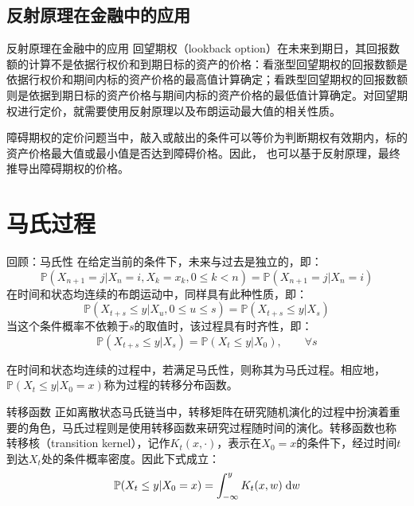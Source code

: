 \documentclass[t]{beamer}
\newcommand{\dif}{{\;\rm d}}
\renewcommand{\Pr}{\mathbb{P}}
\begin{document}
\subsection{反射原理在金融中的应用}
\begin{frame}{反射原理在金融中的应用}
  回望期权（lookback option）在未来到期日，其回报数额的计算不是依据行权价和到期日标的资产的价格：看涨型回望期权的回报数额是依据行权价和期间内标的资产价格的最高值计算确定；看跌型回望期权的回报数额则是依据到期日标的资产价格与期间内标的资产价格的最低值计算确定。对回望期权进行定价，就需要使用反射原理以及布朗运动最大值的相关性质。

  障碍期权的定价问题当中，敲入或敲出的条件可以等价为判断期权有效期内，标的资产价格最大值或最小值是否达到障碍价格。因此，
也可以基于反射原理，最终推导出障碍期权的价格。
\end{frame}

\section{马氏过程}
\begin{frame}{回顾：马氏性}
  在给定当前的条件下，未来与过去是独立的，即：
  \begin{equation*}
  \Pr(X_{n+1}=j|X_n=i, X_k=x_k, 0\le k< n)=\Pr(X_{n+1}=j|X_n=i)
  \end{equation*}
  在时间和状态均连续的布朗运动中，同样具有此种性质，即：
  \begin{equation*}
  \Pr(X_{t+s}\le y|X_u, 0\le u\le s)=\Pr(X_{t+s}\le y|X_s)
  \end{equation*}
  当这个条件概率不依赖于$s$的取值时，该过程具有时齐性，即：
  \begin{equation*}
  \Pr(X_{t+s}\le y|X_s)=\Pr(X_{t}\le y|X_0),\qquad \forall s
  \end{equation*}

  \begin{block}{}
    在时间和状态均连续的过程中，若满足马氏性，则称其为马氏过程。相应地，$\Pr(X_{t}\le y|X_0=x)$称为过程的转移分布函数。
  \end{block}
\end{frame}


\begin{frame}{转移函数}
  正如离散状态马氏链当中，转移矩阵在研究随机演化的过程中扮演着重要的角色，马氏过程则是使用转移函数来研究过程随时间的演化。转移函数也称
  转移核（transition kernel），记作$K_t(x,\cdot )$，表示在$X_0=x$的条件下，经过时间$t$到达$X_t$处的条件概率密度。因此下式成立：
  \begin{equation*}
  \Pr(X_{t}\le y|X_0=x)=\int^{y}_{-\infty} K_t(x,w)\dif w
  \end{equation*}
\end{frame}
\end{document}
